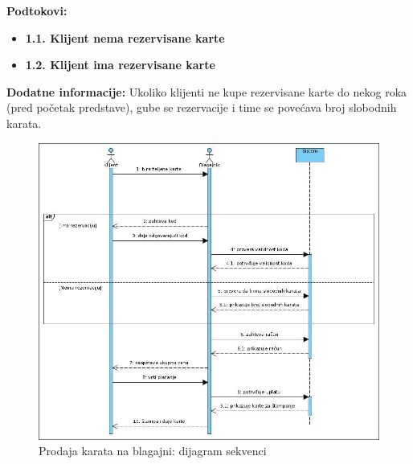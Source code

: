 \documentclass[a4paper]{article}
\begin{document}
  \noindent\textbf{Podtokovi:}
  \begin{itemize}
    \item \textbf{1.1. Klijent nema rezervisane karte}
    \item \textbf{1.2. Klijent ima rezervisane karte}
  \end{itemize}

\noindent\textbf{Dodatne informacije:} Ukoliko klijenti ne kupe rezervisane karte do nekog roka (pred početak predstave),
gube se rezervacije i time se povećava broj slobodnih karata.

\begin{figure}[H]
  \begin{center}
      \includegraphics[width=120mm]{../images/sequence_prodaja_karata.jpg}
  \end{center}
  \caption{Prodaja karata na blagajni: dijagram sekvenci}
  \label{sequence_prodaja_karata}
\end{figure}
\end{document}
